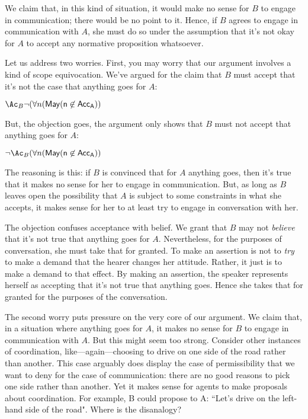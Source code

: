 \documentclass[11pt,article,oneside]{memoir}
\begin{document}
We claim that, in this kind of situation, it would make no sense for $B$ to engage in communication; there would be no point to it. Hence, if $B$ agrees to engage in communication with $A$, she must do so under the assumption that it's not okay for $A$ to accept any normative proposition whatsoever. 

Let us address two worries. First, you may worry that our argument involves a kind of scope equivocation. We've argued for the claim that $B$ must accept that it's not the case that anything goes for $A$:
\begin{center}
$\Ac_B \lnot (\forall n (\sf{May} (n \not \in {Acc}_A))$
\end{center}
But, the objection goes, the argument only shows that $B$ must not accept that anything goes for $A$:
\begin{center}
$\lnot \Ac_B (\forall n (\sf{May} (n \not \in {Acc}_A))$ 
\end{center}
The reasoning is this: if $B$ is convinced that for $A$ anything goes, then it's true that it makes no sense for her to engage in communication. But, as long as $B$ leaves open the possibility that $A$ is subject to some constraints in what she accepts, it makes sense for her to at least try to engage in conversation with her.

The objection confuses acceptance with belief. We grant that $B$ may not \emph{believe} that it's not true that anything goes for $A$. Nevertheless, for the purposes of conversation, she must take that for granted. To make an assertion is not to \emph{try} to make a demand that the hearer changes her attitude. Rather, it just is to make a demand to that effect. By making an assertion, the speaker represents herself as accepting that it's not true that anything goes. Hence she takes that for granted for the purposes of the conversation. 

The second worry puts pressure on the very core of our argument. We claim that, in a situation where anything goes for $A$, it makes no sense for $B$ to engage in communication with $A$. But this might seem too strong. Consider other instances of coordination, like---again---choosing to drive on one side of the road rather than another. This case arguably does display the case of permissibility that we want to deny for the case of communication: there are no good reasons to pick one side rather than another. Yet it makes sense for agents to make proposals about coordination. For example, B could propose to A: ``Let's drive on the left-hand side of the road". Where is the disanalogy?
\end{document}
